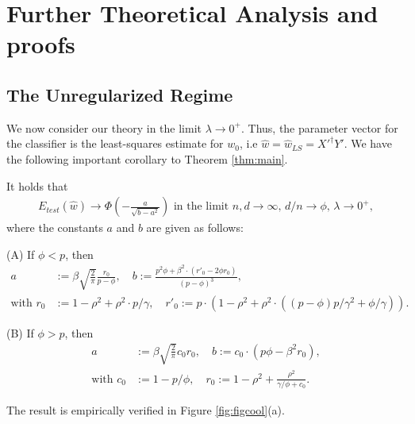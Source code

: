 \section{Further Theoretical Analysis and proofs}\label{app:theory}
\subsection{The Unregularized Regime}

We now consider our theory in the limit  $\lambda \to 0^+$. Thus, the parameter vector for the classifier is the least-squares estimate for $w_0$, i.e $\hat w=\hat w_{LS} = {X'}^\dagger Y'$. We have the following important corollary to Theorem \ref{thm:main}.

\begin{corollary}
It holds that 
\begin{eqnarray}
E_{test}(\hat w) \to \Phi(-\frac{a}{\sqrt{b-a^2}})\text{ in the limit }n,d \to \infty,\,d/n \to \phi,\,\lambda\to 0^+,
\end{eqnarray}
where the constants $a$ and $b$ are given as follows:

(A) If $\phi < p$, then
\begin{align}
 a &:= \beta \sqrt{\frac{2}{\pi}} \frac{r_0}{p-\phi},\quad b := \frac{p^2\phi + \beta^2\cdot\left(r'_0-2\phi r_0\right)}{(p-\phi)^3},\\
 \text{with }
r_0 &:= 1-\rho^2+\rho^2\cdot p/\gamma,\quad
r'_0 := p\cdot \left(1-\rho^2 + \rho^2\cdot ((p-\phi)p/\gamma^2+\phi/\gamma)\right).
\end{align}

(B) If $\phi > p$, then
\begin{align}
a &:= \beta\sqrt{\frac{2}{\pi}}c_0r_0,\quad b := c_0\cdot\left(p\phi - \beta^2 r_0\right),\\
\text{with }c_0 &:=1-p/\phi,\quad r_0 := 1-\rho^2 + \frac{\rho^2}{\gamma/\phi + c_0}.
\end{align}
\label{cor:ridgeless}
\end{corollary}
The result is empirically verified in Figure \ref{fig:figcool}(a). 


